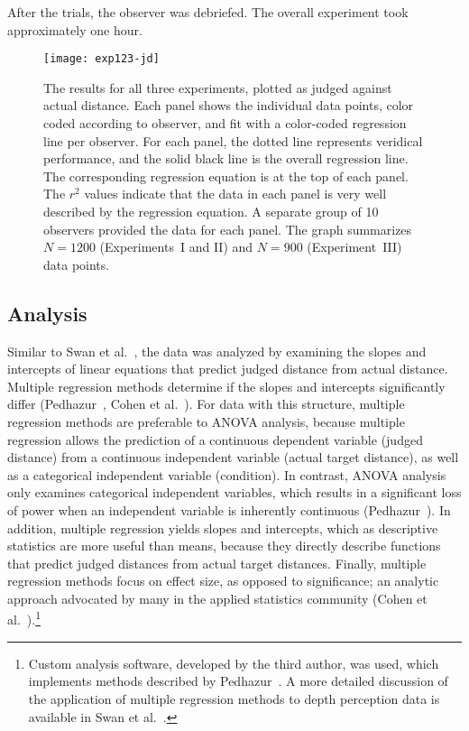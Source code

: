 \documentclass[10pt,journal,compsoc]{IEEEtran}
\makeatletter
\newlength{\FigWidth}
\newcommand{\etal}{et al.\@\xspace} %
\makeatother
\begin{document}
After the trials, the observer was debriefed.  The overall experiment took approximately one hour. 

\begin{figure*}[!t]
\centering
\texttt{[image: exp123-jd]} %
\caption{The results for all three experiments, plotted as judged against actual distance.  Each panel shows the individual data points, color coded according to observer, and fit with a color-coded regression line per observer.  For each panel, the dotted line represents veridical performance, and the solid black line is the overall regression line.  The corresponding regression equation is at the top of each panel.  The $r^{2}$ values indicate that the data in each panel is very well described by the regression equation.  A separate group of 10 observers provided the data for each panel.  The graph summarizes  $N = 1200$ (Experiments~I and II) and $N = 900$ (Experiment~III) data points.}
\label{f:jd}
\end{figure*}

\subsection {Analysis}

Similar to Swan \etal~\cite{swan:2015}, the data was analyzed by examining the slopes and intercepts of linear equations that predict judged distance from actual distance.  Multiple regression methods determine if the slopes and intercepts significantly differ (Pedhazur~\cite{pedhazur:1982}, Cohen \etal~\cite{cohen:2003}).  For data with this structure, multiple regression methods are preferable to ANOVA analysis, because multiple regression allows the prediction of a continuous dependent variable (judged distance) from a continuous independent variable (actual target distance), as well as a categorical independent variable (condition).  In contrast, ANOVA analysis only examines categorical independent variables, which results in a significant loss of power when an independent variable is inherently continuous (Pedhazur~\cite{pedhazur:1982}).  In addition, multiple regression yields slopes and intercepts, which as descriptive statistics are more useful than means, because they directly describe functions that predict judged distances from actual target distances.  Finally, multiple regression methods focus on effect size, as opposed to significance; an analytic approach advocated by many in the applied statistics community (Cohen \etal~\cite{cohen:2003}).\footnote{%
Custom analysis software, developed by the third author, was used, which implements methods described by Pedhazur~\cite{pedhazur:1982}.  A more detailed discussion of the application of multiple regression methods to depth perception data is available in Swan \etal~\cite{swan:2015}.}%
\end{document}
